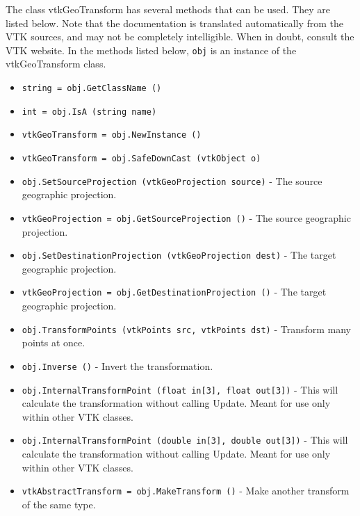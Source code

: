 The class vtkGeoTransform has several methods that can be used.
  They are listed below.
Note that the documentation is translated automatically from the VTK sources,
and may not be completely intelligible.  When in doubt, consult the VTK website.
In the methods listed below, \verb|obj| is an instance of the vtkGeoTransform class.
\begin{itemize}
\item  \verb|string = obj.GetClassName ()|

\item  \verb|int = obj.IsA (string name)|

\item  \verb|vtkGeoTransform = obj.NewInstance ()|

\item  \verb|vtkGeoTransform = obj.SafeDownCast (vtkObject o)|

\item  \verb|obj.SetSourceProjection (vtkGeoProjection source)| -  The source geographic projection.

\item  \verb|vtkGeoProjection = obj.GetSourceProjection ()| -  The source geographic projection.

\item  \verb|obj.SetDestinationProjection (vtkGeoProjection dest)| -  The target geographic projection.

\item  \verb|vtkGeoProjection = obj.GetDestinationProjection ()| -  The target geographic projection.

\item  \verb|obj.TransformPoints (vtkPoints src, vtkPoints dst)| -  Transform many points at once.

\item  \verb|obj.Inverse ()| -  Invert the transformation.

\item  \verb|obj.InternalTransformPoint (float in[3], float out[3])| -  This will calculate the transformation without calling Update.
 Meant for use only within other VTK classes.

\item  \verb|obj.InternalTransformPoint (double in[3], double out[3])| -  This will calculate the transformation without calling Update.
 Meant for use only within other VTK classes.

\item  \verb|vtkAbstractTransform = obj.MakeTransform ()| -  Make another transform of the same type.

\end{itemize}
